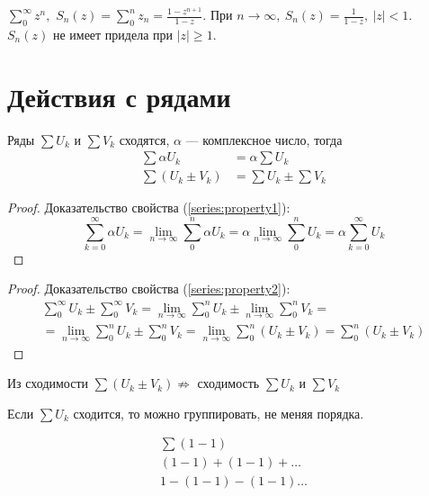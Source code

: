 \begin{example}
  $\sum\limits_0^\infty z^n,$
  $S_n(z) = \sum\limits_0^n z_n = \frac{1-z^{n+1}}{1-z}$.
  При $n \to \infty, \ S_n(z) = \frac{1}{1 - z}, \ |z| < 1$. \\
  $S_n(z)$ не имеет придела при $|z| \geq 1$.
\end{example}

\section{Действия с рядами}

\begin{theorem}
  Ряды $\sum U_k$ и $\sum V_k$ сходятся, $\alpha$ --- комплексное число, тогда
  \begin{align}
    \label{series:property1}
    \sum\alpha U_k &= \alpha\sum U_k \\
    \label{series:property2}
    \sum (U_k \pm V_k) &= \sum U_k \pm \sum V_k
  \end{align}
\end{theorem}
\begin{proof}
  Доказательство свойства (\eqref{series:property1}):
  $$\sum\limits_{k=0}^\infty \alpha U_k = \lim\limits_{n \to \infty}
  \sum\limits_0^n \alpha U_k = \alpha \lim\limits_{n \to \infty} \sum\limits_0^n U_k
  = \alpha \sum\limits_{k = 0}^\infty U_k$$
\end{proof}
\begin{proof}
  Доказательство свойства (\eqref{series:property2}):
  \begin{gather*}
      \sum\limits_0^\infty U_k \pm \sum\limits_{0}^{\infty} V_k
      = \lim\limits_{n \to \infty} \sum\limits_{0}^{n} U_k
      \pm \lim\limits_{n \to \infty} \sum\limits_{0}^{n} V_k = \\
      = \lim\limits_{n \to \infty} \sum\limits_{0}^{n} U_k
      \pm \sum\limits_{0}^{n} V_k
      = \lim\limits_{n \to \infty} \sum\limits_{0}^{n} (U_k \pm V_k)
      = \sum\limits_{0}^{n} (U_k \pm V_k)
  \end{gather*}
\end{proof}

\begin{remark}
  Из сходимости $\sum (U_k \pm V_k) \not \Rightarrow$ сходимость
  $\sum U_k$ и $\sum V_k$
\end{remark}
\begin{remark}
  Если $\sum U_k$ сходится, то можно группировать, не меняя порядка.
\end{remark}
\begin{example}
  \begin{gather*}
    \sum (1 - 1) \\
    (1 - 1) + (1 - 1) + \dots \\
    1 - (1 - 1) - (1 - 1) \dots
  \end{gather*}
\end{example}
\begin{comment}
  Нельзя раскрывать скобки и переставлять члены.
\end{comment}
